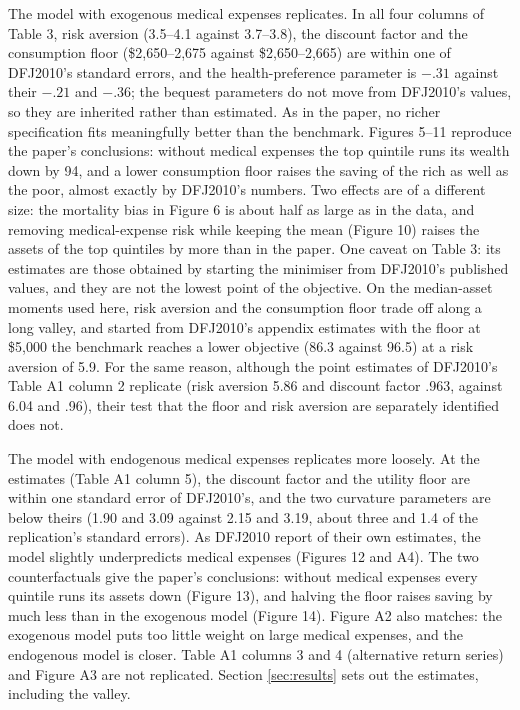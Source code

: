 \documentclass[11pt,fleqn]{article}
\begin{document}
The model with exogenous medical expenses replicates. In all four columns of Table 3, risk aversion (3.5--4.1 against 3.7--3.8), the discount factor and the consumption floor (\$2,650--2,675 against \$2,650--2,665) are within one of DFJ2010's standard errors, and the health-preference parameter is $-.31$ against their $-.21$ and $-.36$; the bequest parameters do not move from DFJ2010's values, so they are inherited rather than estimated. As in the paper, no richer specification fits meaningfully better than the benchmark. Figures 5--11 reproduce the paper's conclusions: without medical expenses the top quintile runs its wealth down by 94, and a lower consumption floor raises the saving of the rich as well as the poor, almost exactly by DFJ2010's numbers. Two effects are of a different size: the mortality bias in Figure 6 is about half as large as in the data, and removing medical-expense risk while keeping the mean (Figure 10) raises the assets of the top quintiles by more than in the paper. One caveat on Table 3: its estimates are those obtained by starting the minimiser from DFJ2010's published values, and they are not the lowest point of the objective. On the median-asset moments used here, risk aversion and the consumption floor trade off along a long valley, and started from DFJ2010's appendix estimates with the floor at \$5,000 the benchmark reaches a lower objective (86.3 against 96.5) at a risk aversion of 5.9. For the same reason, although the point estimates of DFJ2010's Table A1 column 2 replicate (risk aversion 5.86 and discount factor .963, against 6.04 and .96), their test that the floor and risk aversion are separately identified does not.

The model with endogenous medical expenses replicates more loosely. At the estimates (Table A1 column 5), the discount factor and the utility floor are within one standard error of DFJ2010's, and the two curvature parameters are below theirs (1.90 and 3.09 against 2.15 and 3.19, about three and 1.4 of the replication's standard errors). As DFJ2010 report of their own estimates, the model slightly underpredicts medical expenses (Figures 12 and A4). The two counterfactuals give the paper's conclusions: without medical expenses every quintile runs its assets down (Figure 13), and halving the floor raises saving by much less than in the exogenous model (Figure 14). Figure A2 also matches: the exogenous model puts too little weight on large medical expenses, and the endogenous model is closer. Table A1 columns 3 and 4 (alternative return series) and Figure A3 are not replicated. Section \ref{sec:results} sets out the estimates, including the valley.
\end{document}
